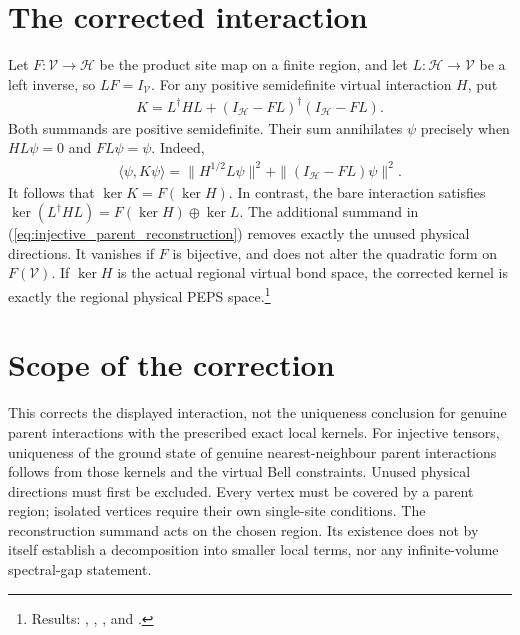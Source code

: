 \documentclass{article}
\begin{document}
\section{The corrected interaction}
Let $F:\mathcal V\longrightarrow\mathcal H$ be the product site map
on a finite region, and let $L:\mathcal H\longrightarrow\mathcal V$
be a left inverse, so $LF=I_{\mathcal V}$. For any positive semidefinite
virtual interaction $H$, put
\begin{align}
    K=L^\dagger H L+(I_{\mathcal H}-FL)^\dagger(I_{\mathcal H}-FL).
    \label{eq:injective_parent_reconstruction}
\end{align}
Both summands are positive semidefinite. Their sum annihilates $\psi$
precisely when $HL\psi=0$ and $FL\psi=\psi$. Indeed,
\begin{align*}
    \langle\psi,K\psi\rangle
      =\|H^{1/2}L\psi\|^2+\|(I_{\mathcal H}-FL)\psi\|^2.
\end{align*}
It follows that $\ker K=F(\ker H)$.
In contrast, the bare interaction satisfies
$\ker(L^\dagger HL)=F(\ker H)\oplus\ker L$.
The additional summand in (\ref{eq:injective_parent_reconstruction})
removes exactly the unused physical directions. It vanishes if $F$ is
bijective, and does not alter the quadratic form on $F(\mathcal V)$.
If $\ker H$ is the actual regional virtual bond space, the corrected
kernel is exactly the regional physical PEPS space.\footnote{Results:
    ,
    ,
    , and
    .}

\section{Scope of the correction}
This corrects the displayed interaction, not the uniqueness conclusion
for genuine parent interactions with the prescribed exact local kernels.
For injective tensors, uniqueness of the ground state of genuine
nearest-neighbour parent interactions follows from those kernels and the
virtual Bell constraints. Unused physical directions must first be excluded. Every vertex must be covered by a parent region;
isolated vertices require their own single-site conditions.
The reconstruction summand acts on the chosen region. Its existence does
not by itself establish a decomposition into smaller local terms, nor
any infinite-volume spectral-gap statement.



\end{document}
